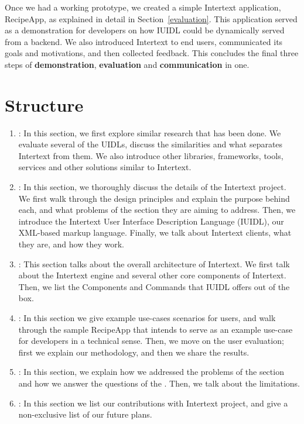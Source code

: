 Once we had a working prototype, we created a simple Intertext application, RecipeApp, as explained in detail in Section~\ref{evaluation}. This application served as a demonstration for developers on how IUIDL could be dynamically served from a backend. We also introduced Intertext to end users, communicated its goals and motivations, and then collected feedback. This concludes the final three steps of \textbf{demonstration}, \textbf{evaluation} and \textbf{communication} in one.

\section{Structure} \label{structure}

\begin{enumerate}
    
    \item \textbf{}: In this section, we first explore similar research that has been done. We evaluate several of the UIDLs, discuss the similarities and what separates Intertext from them. We also introduce other libraries, frameworks, tools, services and other solutions similar to Intertext.

    \item \textbf{}: In this section, we thoroughly discuss the details of the Intertext project. We first walk through the design principles and explain the purpose behind each, and what problems of the  section they are aiming to address. Then, we introduce the Intertext User Interface Description Language (IUIDL), our XML-based markup language. Finally, we talk about Intertext clients, what they are, and how they work.

    \item \textbf{}: This section talks about the overall architecture of Intertext. We first talk about the Intertext engine and several other core components of Intertext. Then, we list the Components and Commands that IUIDL offers out of the box.
    
    \item \textbf{}: In this section we give example use-cases scenarios for users, and walk through the sample RecipeApp that intends to serve as an example use-case for developers in a technical sense. Then, we move on the user evaluation; first we explain our methodology, and then we share the results.

    \item \textbf{}: In this section, we explain how we addressed the problems of the  section and how we answer the questions of the . Then, we talk about the limitations.

    \item \textbf{}: In this section we list our contributions with Intertext project, and give a non-exclusive list of our future plans.
    
\end{enumerate}